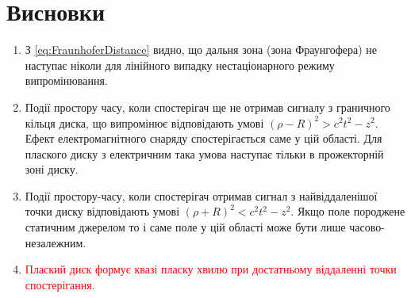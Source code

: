 \chapter*{Висновки}

\begin{enumerate}
%
\item З \eqref{eq:FraunhoferDistance} видно, що дальня зона (зона Фраунгофера) не 
наступає ніколи для лінійного випадку нестаціонарного режиму випромінювання.
%
\item Події простору часу, коли спостерігач ще не отримав сигналу з граничного кільця
диска, що випромінює відповідають умові $ (\rho - R)^2 > c^2 t^2 - z^2 $. 
Ефект електромагнітного снаряду спостерігається саме у цій області. Для плаского 
диску з електричним така умова наступає тільки в прожекторній зоні диску.
%
\item Події простору-часу, коли спостерігач отримав сигнал з найвіддаленішої точки 
диску відповідають умові $ (\rho + R)^2 < c^2 t^2 - z^2 $. Якщо поле породжене 
статичним джерелом то і саме поле у цій області може бути лише часово-незалежним.
%
\item \textcolor{red}{ Плаский диск формує квазі пласку хвилю при достатньому 
віддаленні точки спостерігання. }
%
\end{enumerate}
%

